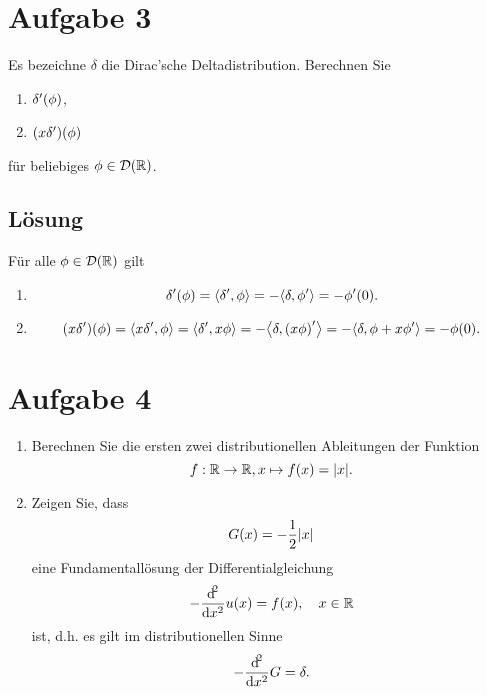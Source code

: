 \documentclass{exercise}
\begin{document}
    
    \section*{Aufgabe 3}
    
    \begin{problem}
        Es bezeichne \(\delta\) die Dirac'sche Deltadistribution.
        Berechnen Sie
        \begin{enumerate}
            \item \(\delta'\parentheses*{\phi}\),
            \item \(\parentheses*{x\delta'}\parentheses*{\phi}\)
        \end{enumerate}
        für beliebiges \(\phi \in \mathcal{D}\parentheses*{\R}\).
    \end{problem}
    
    \subsection*{Lösung}
    Für alle \(\phi \in \mathcal{D}\parentheses*{\R}\) gilt
    \begin{enumerate}
        \item
        \[
            \delta'\parentheses*{\phi} = \angles*{\delta', \phi} = -\angles*{\delta, \phi'} = -\phi'\parentheses*{0}.
        \]
        \item
        \[
            \parentheses*{x\delta'}\parentheses*{\phi} = \angles*{x\delta', \phi} = \angles*{\delta', x\phi} = -\angles*{\delta, \parentheses*{x\phi}'} = -\angles*{\delta, \phi + x\phi'} = -\phi\parentheses*{0}.
        \]
    \end{enumerate}
    
    
    \section*{Aufgabe 4}
    
    \begin{problem}
        \begin{enumerate}
            \item Berechnen Sie die ersten zwei distributionellen Ableitungen der Funktion
            \[
                f: \R \to \R, x \mapsto f\parentheses*{x} = \absolute*{x}.
            \]
            \item Zeigen Sie, dass
            \[
                G\parentheses*{x} = -\frac{1}{2}\absolute*{x}
            \]
            eine Fundamentallösung der Differentialgleichung
            \[
                -\frac{\d^2}{\d x^2}u\parentheses*{x} = f\parentheses*{x}, \quad x \in \R
            \]
            ist, d.h. es gilt im distributionellen Sinne
            \[
                -\frac{\mathop{\mathrm{d}\!}^2}{\mathop{\mathrm{d}\!} x^2}G = \delta.
            \]
        \end{enumerate}
    \end{problem}
    
\end{document}
